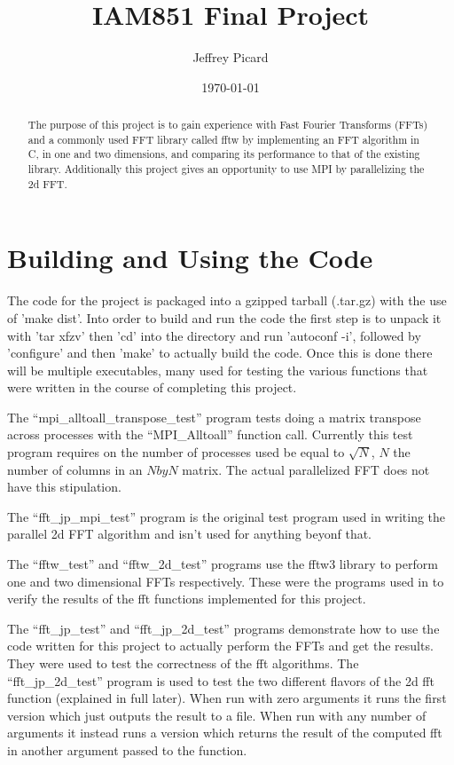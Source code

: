 \documentclass[12pt]{article}
\date{\small\today} \title{IAM851 Final Project} \author{Jeffrey Picard}
\begin{document}
\maketitle


\begin{abstract}
The purpose of this project is to gain experience with Fast Fourier Transforms (FFTs) and a commonly used FFT library called fftw by implementing an FFT
algorithm in C, in one and two dimensions, and comparing its performance to that of the existing library. Additionally this project gives an opportunity 
to use MPI by parallelizing the 2d FFT.
\end{abstract}


\section{Building and Using the Code}
The code for the project is packaged into a gzipped tarball (.tar.gz) with the use of 'make dist'. Into order to build and run the code the first step
is to unpack it with 'tar xfzv' then 'cd' into the directory and run 'autoconf -i', followed by 'configure' and then 'make' to actually build the code.
Once this is done there will be multiple executables, many used for testing the various functions that were written in the course of completing this 
project. 

The ``mpi\_alltoall\_transpose\_test'' program tests doing a matrix transpose across processes with the ``MPI\_Alltoall'' function call. Currently
this test program requires on the number of processes used be equal to $\sqrt{N}$, $N$ the number of columns in an $N by N$ matrix. The actual 
parallelized FFT does not have this stipulation.

The ``fft\_jp\_mpi\_test'' program is the original test program used in writing the parallel 2d FFT algorithm and isn't used for anything beyonf that.

The ``fftw\_test'' and ``fftw\_2d\_test'' programs use the fftw3 library to perform one and two dimensional FFTs respectively. These were the programs
used in to verify the results of the fft functions implemented for this project.

The ``fft\_jp\_test'' and ``fft\_jp\_2d\_test'' programs demonstrate how to use the code written for this project to actually perform the FFTs and
get the results. They were used to test the correctness of the fft algorithms. The ``fft\_jp\_2d\_test'' program is used to test the two different
flavors of the 2d fft function (explained in full later). When run with zero arguments it runs the first version which just outputs the result to 
a file. When run with any number of arguments it instead runs a version which returns the result of the computed fft in another argument passed to the
function.
\end{document}
